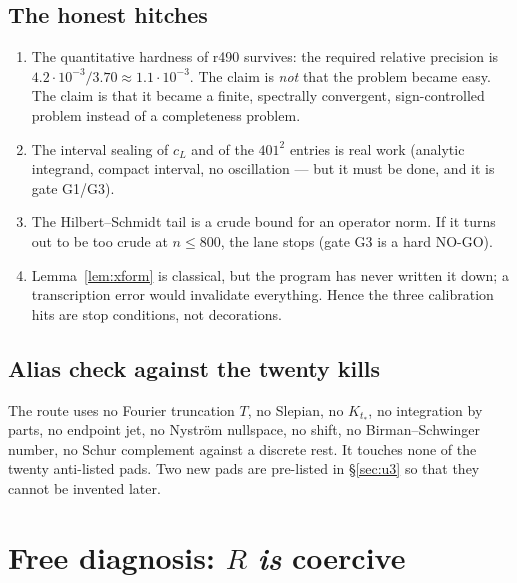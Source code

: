 \documentclass[11pt]{article}
\theoremstyle{remark}
\begin{document}
\subsection{The honest hitches}

\begin{enumerate}
\item The quantitative hardness of r490 survives: the required
relative precision is $4.2\cdot10^{-3}/3.70\approx1.1\cdot10^{-3}$.
The claim is \emph{not} that the problem became easy.  The claim
is that it became a finite, spectrally convergent,
sign-controlled problem instead of a completeness problem.
\item The interval sealing of $c_L$ and of the $401^2$ entries
is real work (analytic integrand, compact interval, no
oscillation --- but it must be done, and it is gate G1/G3).
\item The Hilbert--Schmidt tail is a crude bound for an
operator norm.  If it turns out to be too crude at $n\le800$,
the lane stops (gate G3 is a hard NO-GO).
\item Lemma~\ref{lem:xform} is classical, but the program has
never written it down; a transcription error would invalidate
everything.  Hence the three calibration hits are stop
conditions, not decorations.
\end{enumerate}

\subsection{Alias check against the twenty kills}

The route uses no Fourier truncation $T$, no Slepian, no
$K_{t_*}$, no integration by parts, no endpoint jet, no
Nystr\"om nullspace, no shift, no Birman--Schwinger number, no
Schur complement against a discrete rest.
It touches none of the twenty anti-listed pads.
Two new pads are pre-listed in \S\ref{sec:u3} so that they
cannot be invented later.

\section{Free diagnosis: $R$ \emph{is} coercive}\label{sec:coerc}
\end{document}
